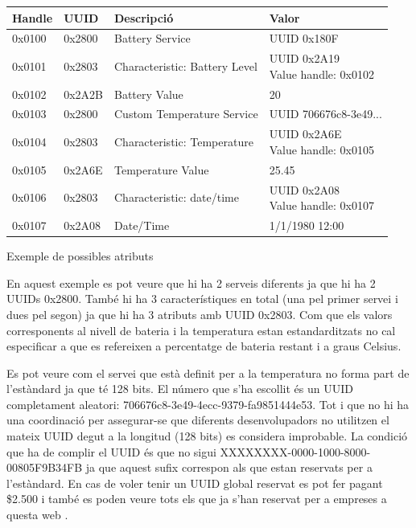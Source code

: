 \begin{center}
	\begin{tabular}{|l|l|l|l|}
		\hline
		Handle	&	UUID	&	Descripció						&	Valor		\\ 	\hline
		0x0100	&	0x2800	&	Battery Service					&	UUID 0x180F	\\		\hline
		0x0101	&	0x2803	&	Characteristic: Battery Level	&	\parbox[t]{4cm}{UUID 0x2A19	\\ Value handle: 0x0102}	\\	\hline
		0x0102	&	0x2A2B	&	Battery Value					&	20	\\	\hline
		0x0103	&	0x2800	&	Custom Temperature Service		&	UUID 	706676c8-3e49...	\\	\hline
		0x0104	&	0x2803	&	Characteristic: Temperature		&	\parbox[t]{4cm}{UUID 0x2A6E	\\ Value handle: 0x0105}	\\		\hline
		0x0105	&	0x2A6E	&	Temperature Value				&	25.45	\\	\hline
		0x0106	&	0x2803	&	Characteristic: date/time		&	\parbox[t]{4cm}{UUID 0x2A08	\\ Value handle: 0x0107}	\\		\hline
		0x0107	&	0x2A08	&	Date/Time						&	1/1/1980 12:00	\\
		\hline
	\end{tabular}

Exemple de possibles atributs
\end{center}

En aquest exemple es pot veure que hi ha 2 serveis diferents ja que hi ha 2 UUIDs 0x2800.
També hi ha 3 característiques en total (una pel primer servei i dues pel segon) ja que hi ha 3 atributs amb UUID 0x2803.
Com que els valors corresponents al nivell de bateria\cite{Battery_Level} i la temperatura\cite{Temperature_Characteristic} estan estandarditzats no cal especificar a que es refereixen a percentatge de bateria restant i a graus Celsius.

Es pot veure com el servei que està definit per a la temperatura no forma part de l'estàndard ja que té 128 bits.
El número que s'ha escollit és un UUID completament aleatori: 706676c8-3e49-4ecc-9379-fa9851444e53.
Tot i que no hi ha una coordinació per assegurar-se que diferents desenvolupadors no utilitzen el mateix UUID degut a la longitud (128 bits) es considera improbable.
La condició que ha de complir el UUID és que no sigui XXXXXXXX-0000-1000-8000-00805F9B34FB ja que aquest sufix correspon als que estan reservats per a l'estàndard.
En cas de voler tenir un UUID global reservat es pot fer pagant \$2.500 i també es poden veure tots els que ja s'han reservat per a empreses a questa web \cite{reservedUUIDs}.

